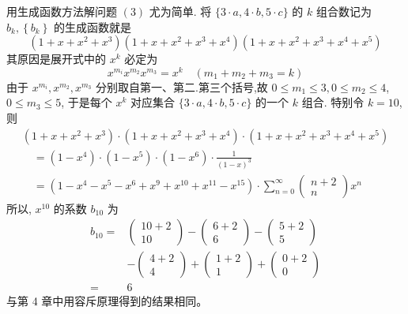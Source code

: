 \documentclass{report}
\begin{document}
用生成函数方法解问题 $(3)$ 尤为简单. 将 $\{3 \cdot a, 4 \cdot b, 5 \cdot c\}$ 的 $k$ 组合数记为 $b_{k},\left\{b_{k}\right\}$ 的生成函数就是
$$
\left(1+x+x^{2}+x^{3}\right)\left(1+x+x^{2}+x^{3}+x^{4}\right)\left(1+x+x^{2}+x^{3}+x^{4}+x^{5}\right)
$$
其原因是展开式中的 $x^{k}$ 必定为
$$
x^{m_{i}} x^{m_{2}} x^{m_{3}}=x^{k} \quad\left(m_{1}+m_{2}+m_{3}=k\right)
$$
由于 $x^{m_{i}}, x^{m_{2}}, x^{m_{3}}$ 分别取自第一、第二.第三个括号,故 $0 \leqslant m_{1} \leqslant 3,0 \leqslant m_{2} \leqslant 4$, $0 \leqslant m_{3} \leqslant 5$, 于是每个 $x^{k}$ 对应集合 $\{3 \cdot a, 4 \cdot b, 5 \cdot c\}$ 的一个 $k$ 组合.
特别令 $k=10$,则
$$
\begin{array}{l}
\left(1+x+x^{2}+x^{3}\right) \cdot\left(1+x+x^{2}+x^{3}+x^{4}\right) \cdot\left(1+x+x^{2}+x^{3}+x^{4}+x^{5}\right) \\
\quad=\left(1-x^{4}\right) \cdot\left(1-x^{5}\right) \cdot\left(1-x^{6}\right) \cdot \frac{1}{(1-x)^{3}} \\
\quad=\left(1-x^{4}-x^{5}-x^{6}+x^{9}+x^{10}+x^{11}-x^{15}\right) \cdot \sum_{n=0}^{\infty}\left(\begin{array}{c}
n+2 \\
n
\end{array}\right) x^{n}
\end{array}
$$
所以, $x^{10}$ 的系数 $b_{10}$ 为
$$
\begin{aligned}
b_{10}=&\left(\begin{array}{c}
10+2 \\
10
\end{array}\right)-\left(\begin{array}{c}
6+2 \\
6
\end{array}\right)-\left(\begin{array}{c}
5+2 \\
5
\end{array}\right) \\
&-\left(\begin{array}{c}
4+2 \\
4
\end{array}\right)+\left(\begin{array}{c}
1+2 \\
1
\end{array}\right)+\left(\begin{array}{c}
0+2 \\
0
\end{array}\right) \\
=& 6
\end{aligned}
$$
与第 4 章中用容斥原理得到的结果相同。
\end{document}
